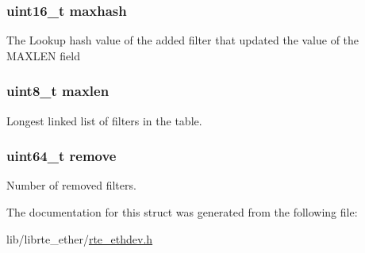 \subsubsection[{maxhash}]{\setlength{\rightskip}{0pt plus 5cm}uint16\+\_\+t maxhash}\label{structrte__eth__fdir_a4831f0a60028910696c19abb4cd2c93c}
The Lookup hash value of the added filter that updated the value of the M\+A\+X\+L\+E\+N field \hypertarget{structrte__eth__fdir_a3e3c2f17b215a23942df0e2bb527e84b}{}
\subsubsection[{maxlen}]{\setlength{\rightskip}{0pt plus 5cm}uint8\+\_\+t maxlen}\label{structrte__eth__fdir_a3e3c2f17b215a23942df0e2bb527e84b}
Longest linked list of filters in the table. \hypertarget{structrte__eth__fdir_ae76c413e5f774d65cf4c01b1dc587202}{}
\subsubsection[{remove}]{\setlength{\rightskip}{0pt plus 5cm}uint64\+\_\+t remove}\label{structrte__eth__fdir_ae76c413e5f774d65cf4c01b1dc587202}
Number of removed filters. 

The documentation for this struct was generated from the following file\+:\begin{DoxyCompactItemize}
\item 
lib/librte\+\_\+ether/\hyperlink{rte__ethdev_8h}{rte\+\_\+ethdev.\+h}\end{DoxyCompactItemize}

